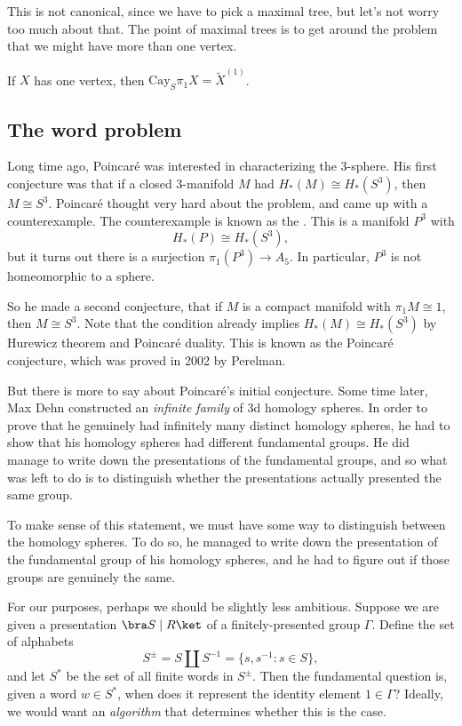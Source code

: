 \documentclass[a4paper]{article}
\newcommand\Cay{\mathrm{Cay}}
\begin{document}
This is not canonical, since we have to pick a maximal tree, but let's not worry too much about that. The point of maximal trees is to get around the problem that we might have more than one vertex.

\begin{ex}
  If $X$ has one vertex, then $\Cay_S \pi_1 X = \tilde{X}^{(1)}$.
\end{ex}

\subsection{The word problem}
Long time ago, Poincar\'e was interested in characterizing the $3$-sphere. His first conjecture was that if a closed $3$-manifold $M$ had $H_*(M) \cong H_*(S^3)$, then $M \cong S^3$. Poincar\'e thought very hard about the problem, and came up with a counterexample. The counterexample is known as the . This is a manifold $P^3$ with
\[
  H_*(P) \cong H_*(S^3),
\]
but it turns out there is a surjection $\pi_1(P^3) \to A_5$. In particular, $P^3$ is not homeomorphic to a sphere.

So he made a second conjecture, that if $M$ is a compact manifold with $\pi_1M \cong 1$, then $M \cong S^3$. Note that the condition already implies $H_*(M) \cong H_*(S^3)$ by Hurewicz theorem and Poincar\'e duality. This is known as the Poincar\'e conjecture, which was proved in 2002 by Perelman.

But there is more to say about Poincar\'e's initial conjecture. Some time later, Max Dehn constructed an \emph{infinite family} of 3d homology spheres. In order to prove that he genuinely had infinitely many distinct homology spheres, he had to show that his homology spheres had different fundamental groups. He did manage to write down the presentations of the fundamental groups, and so what was left to do is to distinguish whether the presentations actually presented the same group.

To make sense of this statement, we must have some way to distinguish between the homology spheres. To do so, he managed to write down the presentation of the fundamental group of his homology spheres, and he had to figure out if those groups are genuinely the same.

For our purposes, perhaps we should be slightly less ambitious. Suppose we are given a presentation $\bra S \mid R\ket$ of a finitely-presented group $\Gamma$. Define the set of alphabets
\[
  S^{\pm} = S \amalg S^{-1} = \{ s, s^{-1}: s \in S\},
\]
and let $S^*$ be the set of all finite words in $S^{\pm}$. Then the fundamental question is, given a word $w \in S^*$, when does it represent the identity element $1 \in \Gamma$? Ideally, we would want an \emph{algorithm} that determines whether this is the case.
\end{document}

